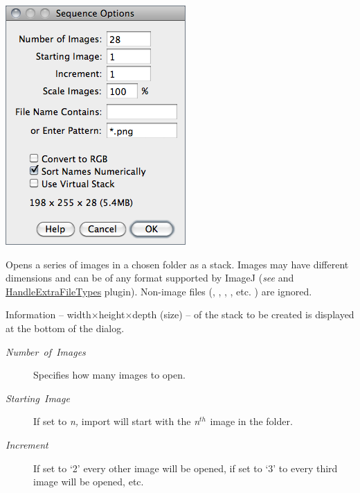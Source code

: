 \begin{minipage}[c][1\totalheight][t]{0.37\columnwidth}%
\includegraphics[scale=0.55]{images/SequenceOptions}%
\end{minipage}%
\begin{minipage}[c][1\totalheight][t]{0.63\columnwidth}%
Opens a series of images in a chosen folder
as a stack. Images may have different dimensions and can be of any
format supported by ImageJ (\emph{see} 
and \href{http://imagej.nih.gov/ij/plugins/file-handler.html}{HandleExtraFileTypes}
plugin). Non-image files (, ,
, , etc. ) are ignored.

\medskip{}


Information -- width$\times$height$\times$depth (size) -- of the
stack to be created is displayed at the bottom of the dialog.
\begin{description}
\item [{\emph{Number\ of\ Images}}] Specifies how many images to open.
\item [{\emph{Starting\ Image}}] If set to \emph{n,} import will start
with the \emph{n}$^{\text{}th}$$^{\text{}}$ image in the folder.
\item [{\emph{Increment}}] If set to `2' every other image will be opened,
if set to `3' to every third image will be opened, etc.\end{description}
%
\end{minipage}
